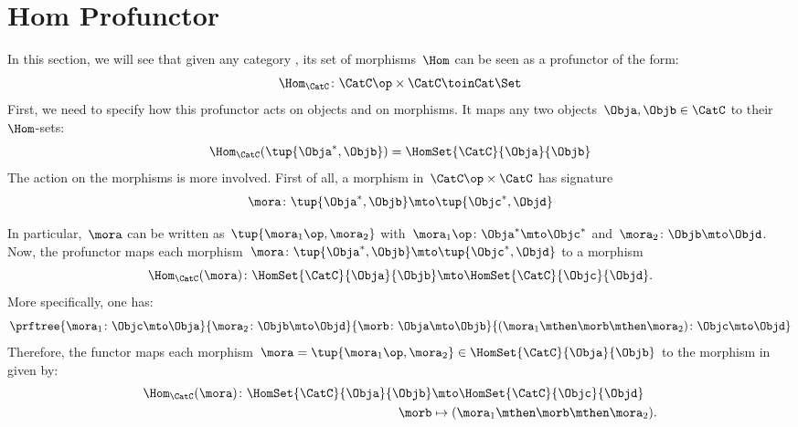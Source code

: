 

\section{Hom Profunctor}


In this section, we will see that given any category \CatC, its set of morphisms~$\Hom$ can be seen as a profunctor of the form:
\begin{equation}
    \label{eq:hom-signature}
    \Hom_\CatC\colon \CatC \op \times \CatC \toinCat \Set
\end{equation}
First, we need to specify how this profunctor acts on objects and on morphisms.
It maps any two objects~$\Obja,\Objb\in \CatC$ to their~$\Hom$-sets:
\begin{equation}
    \label{eq:hom-action}
    \Hom_\CatC(\tup{\Obja^*,\Objb})=\HomSet{\CatC}{\Obja}{\Objb}
\end{equation}
The action on the morphisms is more involved. First of all, a morphism in~$\CatC\op \times \CatC$ has signature~
\begin{equation}
    \label{eq:hom0}
    \mora \colon \tup{\Obja^*,\Objb}\mto \tup{\Objc^*, \Objd}
\end{equation}

In particular,~$\mora$ can be written as~$\tup{\mora_1\op,\mora_2}$ with~$\mora_1\op\colon \Obja^*\mto \Objc^*$ and~$\mora_2\colon \Objb\mto \Objd$.
Now, the profunctor maps each morphism~$\mora \colon \tup{\Obja^*,\Objb}\mto \tup{\Objc^*, \Objd}$ to a morphism
\begin{equation}
    \label{eq:hom2}
    \Hom_\CatC(\mora)\colon \HomSet{\CatC}{\Obja}{\Objb}\mto \HomSet{\CatC}{\Objc}{\Objd}.
\end{equation}
More specifically, one has:
\begin{equation}
    \label{eq:hom3}
    \prftree{\mora_1\colon \Objc \mto \Obja}{\mora_2\colon \Objb\mto \Objd}{\morb\colon \Obja\mto \Objb}{(\mora_1\mthen \morb \mthen \mora_2)\colon \Objc\mto \Objd}
\end{equation}
Therefore, the functor maps each morphism~$\mora=\tup{\mora_1\op,\mora_2}\in \HomSet{\CatC}{\Obja}{\Objb}$ to the morphism in \Set given by:
\begin{equation}
    \label{eq:hom4}
    \begin{aligned}
        \Hom_\CatC(\mora)\colon \HomSet{\CatC}{\Obja}{\Objb}&\mto \HomSet{\CatC}{\Objc}{\Objd}\\
        \morb &\mapsto (\mora_1\mthen \morb \mthen \mora_2).
    \end{aligned}
\end{equation}

